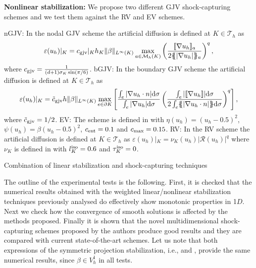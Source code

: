 \begin{algorithm}[Hhtbp]
\textbf{Nonlinear stabilization:} We propose two different GJV shock-capturing schemes and we test them against the RV and EV schemes.
\begin{algorithmic}[1]
\State nGJV: In the nodal GJV scheme the artificial diffusion is defined at $K \in \mathcal{T}_h$ as
\begin{align*}%
\varepsilon(u_h)|_K = c_{\rm gjv}|_K h_K \|\beta\|_{L^\infty(K)} \max_{a \in \setnodes(K)}\left(\frac{ \jump{\nabla u_h}_a }{2\mean{|\nabla u_h|}_a}\right)^q,
\end{align*}
where $c_{\rm gjv} = \frac{1}{(d+1) \sigma_K \sin (\pi/6)}$. %
\State bGJV: In the boundary GJV scheme the artificial diffusion is defined at $K \in \mathcal{T}_h$ as
\begin{align*}%
\varepsilon(u_h)|_K = \tilde c_{\rm gjv} h \|\beta\|_{L^\infty(K)} \max_{e \in \partial K}\left[\frac{\int_e |\nabla u_h \cdot n|{\rm d} \sigma}{\int_e |\nabla u_h| {\rm d} \sigma}\left(\frac{\int_e  | \jump{\nabla u_h}|{\rm d} \sigma }{ 2 \int_e \mean{|\nabla u_h \cdot n|} {\rm d} \sigma}\right)^q\right],
\end{align*}
where $\tilde c_{\rm gjv} = 1/2$.
\State EV: The scheme is defined in  with $\eta(u_h) = (u_h-0.5)^2$, $\psi(u_h) = \beta(u_h-0.5)^2$, $c_{\rm ent} = 0.1$ and $c_{\rm max}=0.15$. 
\State RV: In the RV  scheme the artificial diffusion is defined at $K \in \mathcal{T}_h$ as $\varepsilon(u_h)|_K = \nu_K(u_h) |\mathcal{R}(u_h)|^q$ where $\nu_K$ is defined in  with $l_K^{\rm iso}=0.6$ and $\tau_K^{\rm iso}=0$.
\end{algorithmic}
\caption{Combination of linear stabilization and shock-capturing techniques\label{alg-wNPS-GJV}}
\end{algorithm}

The outline of the experimental tests is the following. First, it is checked that the numerical results obtained with the weighted linear/nonlinear stabilization techniques previously analysed do effectively show monotonic properties in 1$D$. Next we check how the convergence of smooth solutions is affected by the methods proposed.  Finally it is shown that the novel multidimensional shock-capturing schemes proposed by the authors produce good results and they are compared with current state-of-the-art schemes. Let us note that both expressions of the symmetric projection stabilization, i.e.,  and , provide the same numerical results, since $\beta  \in V_h^1$ in all tests.

